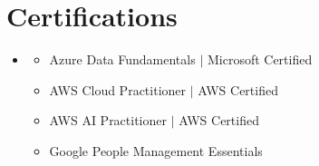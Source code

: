 \documentclass[letterpaper,11pt]{article}
\newcommand{\resumeItem}[1]{
  \item\small{
    {#1 \vspace{2pt}}
  }
}
\newcommand{\resumeSubHeadingListStart}{\begin{itemize}[topsep=0pt, parsep=0pt, itemsep=0pt, leftmargin=0.0in, label={}]}
\newcommand{\resumeSubHeadingListEnd}{\end{itemize}}
\newcommand{\resumeItemListStart}{\begin{itemize}[topsep=0pt, parsep=0pt, itemsep=0pt]}
\newcommand{\resumeItemListEnd}{\end{itemize}\vspace{4pt}}
\begin{document}
\section{Certifications}
    \resumeSubHeadingListStart
        \item[]
            \resumeItemListStart
                \resumeItem{Azure Data Fundamentals  $|$ Microsoft Certified}
                \resumeItem{AWS Cloud Practitioner $|$ AWS Certified}
                \resumeItem{AWS AI Practitioner $|$ AWS Certified}
                \resumeItem{Google People Management Essentials}
            \resumeItemListEnd
    \resumeSubHeadingListEnd
\end{document}
